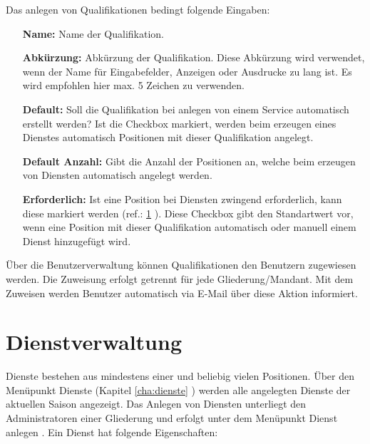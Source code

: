 \vspace*{5mm} \noindent Das anlegen von Qualifikationen bedingt folgende Eingaben:

\begin{itemize}
	\item[\textbf{Name:}] Name der Qualifikation.
	\item[\textbf{Abkürzung:}] Abkürzung der Qualifikation. Diese Abkürzung wird verwendet, wenn der Name für Eingabefelder, Anzeigen oder Ausdrucke zu lang ist. Es wird empfohlen hier max. 5 Zeichen zu verwenden.
	\item[\textbf{Default:}] \glqq Soll die Qualifikation bei anlegen von einem Service automatisch erstellt werden?\grqq{} Ist die Checkbox markiert, werden beim erzeugen eines Dienstes automatisch Positionen mit dieser Qualifikation angelegt.
	\item[\textbf{Default Anzahl:}] Gibt die Anzahl der Positionen an, welche beim erzeugen von Diensten automatisch angelegt werden.
	\item[\textbf{Erforderlich:}] Ist eine Position bei Diensten zwingend erforderlich, kann diese markiert werden (ref.: \ref{sec:admin_service} ). Diese Checkbox gibt den Standartwert vor, wenn eine Position mit dieser Qualifikation automatisch oder manuell einem Dienst hinzugefügt wird.
\end{itemize}

\begin{lamp}[frametitle={Qualifikationen Benutzern zuweisen}]
	Über die Benutzerverwaltung können Qualifikationen den Benutzern zugewiesen werden. Die Zuweisung erfolgt getrennt für jede Gliederung/Mandant. Mit dem Zuweisen werden Benutzer automatisch via E-Mail über diese Aktion informiert.
\end{lamp}

\section{Dienstverwaltung}
\label{sec:admin_service}
Dienste bestehen aus mindestens einer und beliebig vielen Positionen. Über den Menüpunkt Dienste (Kapitel \ref{cha:dienste} ) werden alle angelegten Dienste der aktuellen Saison angezeigt. Das Anlegen von Diensten unterliegt den Administratoren einer Gliederung und erfolgt unter dem Menüpunkt \glqq Dienst anlegen \grqq{}. Ein Dienst hat folgende Eigenschaften:

